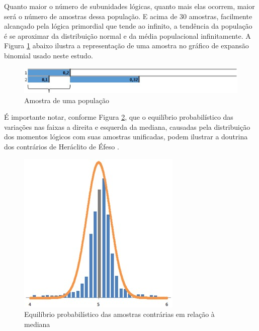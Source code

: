 Quanto maior o número de subunidades lógicas, quanto mais elas ocorrem, maior será o número de amostras dessa população. E acima de 30 amostras, facilmente alcançado pela lógica primordial que tende ao infinito, a tendência da população é se aproximar da distribuição normal e da média populacional infinitamente. A Figura \ref{fig:logical_subunits} abaixo ilustra a representação de uma amostra no gráfico de expansão binomial usado neste estudo.

\begin{figure}[H]
\caption{Amostra de uma população}
\label{fig:logical_subunits}
\centering
\includegraphics[scale=1]{sections/images/logical_subunits.jpg}
\end{figure}

É importante notar, conforme Figura \ref{fig:trend_chart_of_normal_distribution}, que o equilíbrio probabilístico das variações nas faixas a direita e esquerda da mediana, causadas pela distribuição dos momentos lógicos com suas amostras unificadas, podem ilustrar a doutrina dos contrários de Heráclito de Éfeso \cite{brasilescola_heraclito}.

\begin{figure}[H]
\caption{Equilíbrio probabilístico das amostras contrárias em relação à mediana}
\label{fig:trend_chart_of_normal_distribution}
\centering
\includegraphics[scale=1.1]{sections/images/trend_chart_of_normal_distribution.jpg}
\end{figure}

